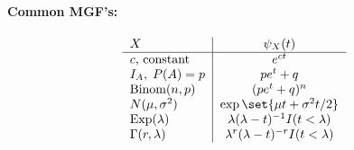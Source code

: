 \documentclass[10pt]{article}
\begin{document}
\begin{multicols}{2}
\paragraph{Common MGF's:}
\[
\begin{tabular}{l|c}
$X$ & $\psi_{X}(t)$ \\
\hline %
$c$, constant & $e^{ct}$ \\
$I_{A}, \; P(A) = p$ & $p{e^{t}} + q$ \\
Binom$(n,p)$ & $(pe^t + q)^n$ \\
$N(\mu,\sigma^2)$ & $\exp\set{\mu t + \sigma^2 t/2}$ \\
Exp$(\lambda)$ & $\lambda(\lambda-t)^{-1} I(t < \lambda)$ \\
$\Gamma(r,\lambda)$ & $\lambda^{r}(\lambda-t)^{-r} I(t < \lambda)$
\end{tabular}
\]
\end{multicols}
\end{document}
